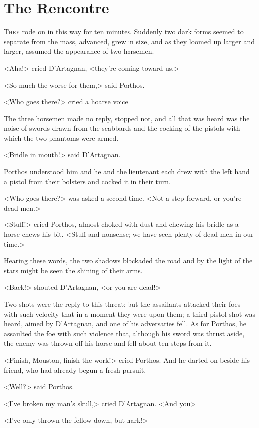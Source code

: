 \chapter{The Rencontre}

 \lettrine{T}{hey} rode on in this way for ten minutes. Suddenly two dark forms seemed to separate from the mass, advanced, grew in size, and as they loomed up larger and larger, assumed the appearance of two horsemen.

<Aha!> cried D'Artagnan, <they're coming toward us.>

<So much the worse for them,> said Porthos.

<Who goes there?> cried a hoarse voice.

The three horsemen made no reply, stopped not, and all that was heard was the noise of swords drawn from the scabbards and the cocking of the pistols with which the two phantoms were armed.

<Bridle in mouth!> said D'Artagnan.

Porthos understood him and he and the lieutenant each drew with the left hand a pistol from their bolsters and cocked it in their turn.

<Who goes there?> was asked a second time. <Not a step forward, or you're dead men.>

<Stuff!> cried Porthos, almost choked with dust and chewing his bridle as a horse chews his bit. <Stuff and nonsense; we have seen plenty of dead men in our time.>

Hearing these words, the two shadows blockaded the road and by the light of the stars might be seen the shining of their arms.

<Back!> shouted D'Artagnan, <or you are dead!>

Two shots were the reply to this threat; but the assailants attacked their foes with such velocity that in a moment they were upon them; a third pistol-shot was heard, aimed by D'Artagnan, and one of his adversaries fell. As for Porthos, he assaulted the foe with such violence that, although his sword was thrust aside, the enemy was thrown off his horse and fell about ten steps from it.

<Finish, Mouston, finish the work!> cried Porthos. And he darted on beside his friend, who had already begun a fresh pursuit.

<Well?> said Porthos.

<I've broken my man's skull,> cried D'Artagnan. <And you\longdash>

<I've only thrown the fellow down, but hark!>

